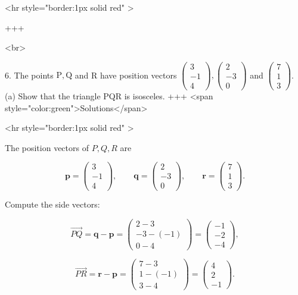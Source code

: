 <hr style="border:1px solid red" >

+++

<br>

6. The points $\mathrm{P}, \mathrm{Q}$ and R have position vectors $\left(\begin{array}{c}3 \\ -1 \\ 4\end{array}\right),\left(\begin{array}{c}2 \\ -3 \\ 0\end{array}\right)$ and $\left(\begin{array}{l}7 \\ 1 \\ 3\end{array}\right)$.
(a) Show that the triangle PQR is isosceles.
+++ <span style="color:green">Solutions</span>

<hr style="border:1px solid red" >

The position vectors of $P,Q,R$ are

$$
\mathbf{p}=\begin{pmatrix}3\\-1\\4\end{pmatrix},\qquad
\mathbf{q}=\begin{pmatrix}2\\-3\\0\end{pmatrix},\qquad
\mathbf{r}=\begin{pmatrix}7\\1\\3\end{pmatrix}.
$$


Compute the side vectors:

$$
\overrightarrow{PQ}=\mathbf{q}-\mathbf{p}
=\begin{pmatrix}2-3\\-3-(-1)\\0-4\end{pmatrix}
=\begin{pmatrix}-1\\-2\\-4\end{pmatrix},
$$


$$
\overrightarrow{PR}=\mathbf{r}-\mathbf{p}
=\begin{pmatrix}7-3\\1-(-1)\\3-4\end{pmatrix}
=\begin{pmatrix}4\\2\\-1\end{pmatrix}.
$$


